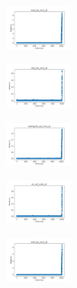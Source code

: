 \begin{figure}[H]
\begin{subfigure}
    \end{subfigure}
    \hfill
    \begin{subfigure}
        \centering
        \includegraphics[width=0.234\textwidth]{img/HS-LS-v2/ecoli_set_const_20_589741062_time.png}
    \end{subfigure}
    \hfill
    \begin{subfigure}
        \centering
        \includegraphics[width=0.234\textwidth]{img/HS-LS-v2/rand_set_const_20_589741062_time.png}
    \end{subfigure}
    \hfill
    \begin{subfigure}
        \centering
        \includegraphics[width=0.234\textwidth]{img/HS-LS-v2/newthyroid_set_const_20_589741062_time.png}
    \end{subfigure}
    \hfill
    \begin{subfigure}
        \centering
        \includegraphics[width=0.234\textwidth]{img/HS-LS-v2/iris_set_const_20_277451237_time.png}
    \end{subfigure}
    \hfill
    \begin{subfigure}
        \centering
        \includegraphics[width=0.234\textwidth]{img/HS-LS-v2/ecoli_set_const_20_277451237_time.png}
    \end{subfigure}

\end{figure}
